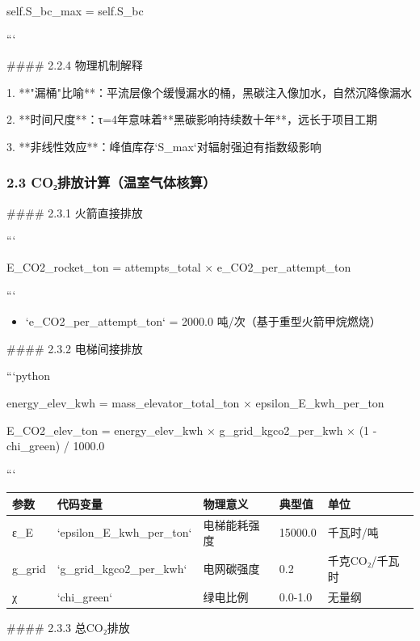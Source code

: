 \documentclass[a4paper,12pt]{article}
\begin{document}
\par
self.S\_bc\_max = self.S\_bc

\par
```

\par
#### 2.2.4 物理机制解释

\par
1. **"漏桶"比喻**：平流层像个缓慢漏水的桶，黑碳注入像加水，自然沉降像漏水

\par
2. **时间尺度**：τ=4年意味着**黑碳影响持续数十年**，远长于项目工期

\par
3. **非线性效应**：峰值库存`S\_max`对辐射强迫有指数级影响

\par
\subsubsection{2.3 CO₂排放计算（温室气体核算）}
#### 2.3.1 火箭直接排放

\par
```

\par
E\_CO2\_rocket\_ton = attempts\_total × e\_CO2\_per\_attempt\_ton

\par
```

\par
\begin{itemize}
\item `e_CO2_per_attempt_ton` = 2000.0 吨/次（基于重型火箭甲烷燃烧）
\end{itemize}
#### 2.3.2 电梯间接排放

\par
```python

\par
energy\_elev\_kwh = mass\_elevator\_total\_ton × epsilon\_E\_kwh\_per\_ton

\par
E\_CO2\_elev\_ton = energy\_elev\_kwh × g\_grid\_kgco2\_per\_kwh × (1 - chi\_green) / 1000.0

\par
```

\par
\begin{center}
\begin{longtable}{|l|l|l|l|l|}
\hline
参数 & 代码变量 & 物理意义 & 典型值 & 单位 \\ \hline
ε_E & `epsilon_E_kwh_per_ton` & 电梯能耗强度 & 15000.0 & 千瓦时/吨 \\ \hline
g_grid & `g_grid_kgco2_per_kwh` & 电网碳强度 & 0.2 & 千克CO₂/千瓦时 \\ \hline
χ & `chi_green` & 绿电比例 & 0.0-1.0 & 无量纲 \\ \hline
\end{longtable}
\end{center}
#### 2.3.3 总CO₂排放
\end{document}
